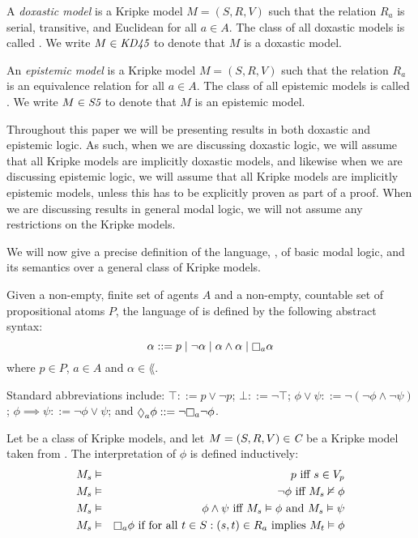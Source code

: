 \begin{definition}
A \textit{doxastic model} is a Kripke model $M = (S, R, V)$ such that the
relation $R_a$ is serial, transitive, and Euclidean for all $a \in A$. The class
of all doxastic models is called \classKD{}. We write $M \in \textit{KD45}{}$ to
denote that $M$ is a doxastic model.
\end{definition}

\begin{definition}
An \textit{epistemic model} is a Kripke model $M = (S, R, V)$ such that the
relation $R_a$ is an equivalence relation for all $a \in A$. The class of all
epistemic models is called \classS{}. We write $M \in \textit{S5}{}$ to denote that
$M$ is an epistemic model.
\end{definition}

Throughout this paper we will be presenting results in both doxastic and
epistemic logic.  As such, when we are discussing doxastic logic, we will
assume that all Kripke models are implicitly doxastic models, and likewise when
we are discussing epistemic logic, we will assume that all Kripke models are
implicitly epistemic models, unless this has to be explicitly proven as part of
a proof. When we are discussing results in general modal logic, we will not
assume any restrictions on the Kripke models.

We will now give a precise definition of the language, \lang{}, of basic modal
logic, and its semantics over a general class of Kripke models.

\begin{definition}
Given a non-empty, finite set of agents $A$ and a non-empty, countable set of
propositional atoms $P$, the language of \langF{} is defined by the following
abstract syntax:
$$
\alpha ::=  p \bnfalt
            \neg \alpha \bnfalt
            \alpha \land \alpha \bnfalt
            \knows_a \alpha
$$
where $p \in P$, $a \in A$ and $\alpha \in \lang{}$.
\end{definition}

Standard abbreviations include:
$\top ::= p \lor \neg p$;
$\bot ::= \neg \top$;
$\phi \lor \psi ::= \neg (\neg \phi \land \neg \psi)$;
$\phi \implies \psi ::= \neg \phi \lor \psi$;
and $\suspects_a \phi ::= \neg \knows_a \neg \phi$.

\begin{definition}
Let \classC{} be a class of Kripke models, and let $M = (S, R, V) \in \textit{C}$
be a Kripke model taken from \classC{}. The interpretation of $\phi$ is defined
inductively:
\begin{eqnarray*}
M_s &\entails& p \text{ iff } s \in V_p\\
M_s &\entails& \neg \phi \text{ iff } M_s \nentails \phi\\
M_s &\entails& \phi \land \psi \text{ iff } M_s \entails \phi \text{ and } M_s
\entails \psi\\
M_s &\entails& \knows_a \phi \text{ if for all } t \in S : (s, t) \in R_a \text{
implies } M_t \entails \phi
\end{eqnarray*}
\end{definition}

